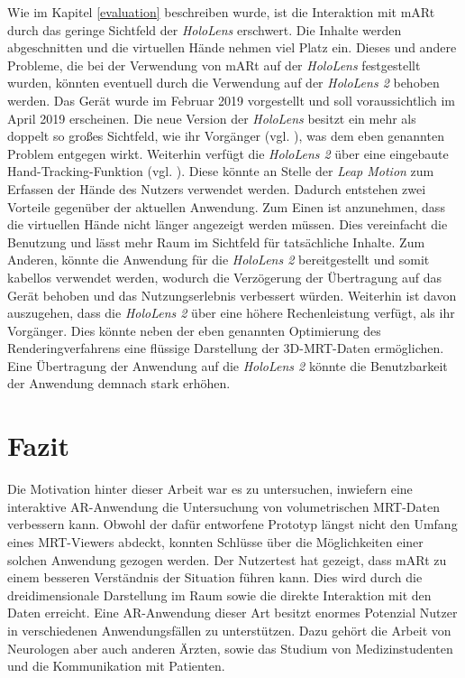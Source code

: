 Wie im Kapitel \ref{evaluation} beschreiben wurde, ist die Interaktion mit mARt durch das geringe Sichtfeld der \textit{HoloLens} erschwert. Die Inhalte werden abgeschnitten und die virtuellen Hände nehmen viel Platz ein. 
Dieses und andere Probleme, die bei der Verwendung von mARt auf der \textit{HoloLens} festgestellt wurden, könnten eventuell durch die Verwendung auf der \textit{HoloLens 2} behoben werden. 
Das Gerät wurde im Februar 2019 vorgestellt und soll voraussichtlich im April 2019 erscheinen. 
Die neue Version der \textit{HoloLens} besitzt ein mehr als doppelt so großes Sichtfeld, wie ihr Vorgänger (vgl. \cite{hololens2}), was dem eben genannten Problem entgegen wirkt. 
Weiterhin verfügt die \textit{HoloLens 2} über eine eingebaute Hand-Tracking-Funktion (vgl. \cite{hololens2}). Diese könnte an Stelle der \textit{Leap Motion} zum Erfassen der Hände des Nutzers verwendet werden. Dadurch entstehen zwei Vorteile gegenüber der aktuellen Anwendung. Zum Einen ist anzunehmen, dass die virtuellen Hände nicht länger angezeigt werden müssen. Dies vereinfacht die Benutzung und lässt mehr Raum im Sichtfeld für tatsächliche Inhalte. Zum Anderen, könnte die Anwendung für die \textit{HoloLens 2} bereitgestellt und somit kabellos verwendet werden, wodurch die Verzögerung der Übertragung auf das Gerät behoben und das Nutzungserlebnis verbessert würden. 
Weiterhin ist davon auszugehen, dass die \textit{HoloLens 2} über eine höhere Rechenleistung verfügt, als ihr Vorgänger. Dies könnte neben der eben genannten Optimierung des Renderingverfahrens eine flüssige Darstellung der 3D-MRT-Daten ermöglichen.
Eine Übertragung der Anwendung auf die \textit{HoloLens 2} könnte die Benutzbarkeit der Anwendung demnach stark erhöhen.


\section{Fazit}

Die Motivation hinter dieser Arbeit war es zu untersuchen, inwiefern eine interaktive AR-Anwendung die Untersuchung von volumetrischen MRT-Daten verbessern kann. Obwohl der dafür entworfene Prototyp längst nicht den Umfang eines MRT-Viewers abdeckt, konnten Schlüsse über die Möglichkeiten einer solchen Anwendung gezogen werden.
Der Nutzertest hat gezeigt, dass mARt zu einem besseren Verständnis der Situation führen kann. Dies wird durch die dreidimensionale Darstellung im Raum sowie die direkte Interaktion mit den Daten erreicht.
Eine AR-Anwendung dieser Art besitzt enormes Potenzial Nutzer in verschiedenen Anwendungsfällen zu unterstützen. Dazu gehört die Arbeit von Neurologen aber auch anderen Ärzten, sowie das Studium von Medizinstudenten und die Kommunikation mit Patienten. 

